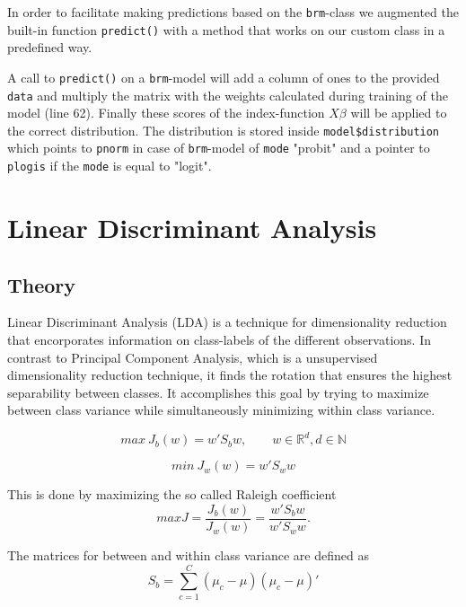 \documentclass{article}
\begin{document}
In order to facilitate making predictions based on the \texttt{brm}-class we augmented the built-in function \texttt{predict()} with a method that works on our custom class in a predefined way.



A call to \texttt{predict()} on a \texttt{brm}-model will add a column of ones to the provided \texttt{data} and multiply the matrix with the weights calculated during training of the model (line 62). Finally these scores of the index-function $X\beta$ will be applied to the correct distribution. The distribution is stored inside \texttt{model\$distribution} which points to \texttt{pnorm} in case of \texttt{brm}-model of \texttt{mode} "probit" and a pointer to \texttt{plogis} if the \texttt{mode} is equal to "logit". 

\section{Linear Discriminant Analysis}
\subsection{Theory}

Linear Discriminant Analysis (LDA) is a technique for dimensionality reduction that encorporates information on class-labels of the different observations. In contrast to  Principal Component Analysis, which is a unsupervised dimensionality reduction technique, it finds the rotation that ensures the highest separability between classes. It accomplishes this goal by trying to maximize between class variance while simultaneously minimizing within class variance.

\begin{equation}
max\ J_{b}(w) = w \prime S_{b} w, \qquad w \in \mathbb{R}^d, d \in \mathbb{N}
\end{equation}

\begin{equation}
min\ J_{w}(w) = w \prime S_{w} w
\end{equation}

This is done by maximizing the so called Raleigh coefficient
\begin{equation}
\label{LDA}
max J = \frac{J_b(w)}{J_w(w)} = \frac{w \prime S_{b} w}{w \prime S_{w} w}.
\end{equation}

The matrices for between and within class variance are defined as
\begin{equation}
S_b = \sum_{c=1}^{C}(\mu_c - \mu)(\mu_c - \mu)\prime
\end{equation}
\end{document}
